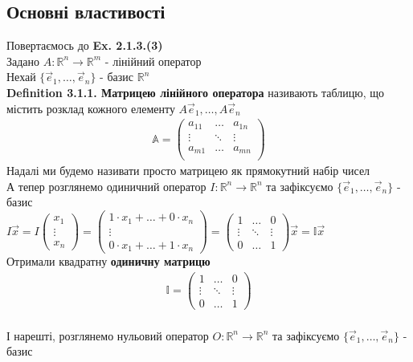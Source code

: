 \documentclass[a4paper, 14pt]{extarticle}
\def\defin#1{\textbf{Definition {#1}}}
\def\bigline{\vspace{5mm}\\}
\begin{document}
	\subsection{Основні властивості}
	Повертаємось до \textbf{Ex. 2.1.3.(3)}\\
	Задано $A: \mathbb{R}^n \to \mathbb{R}^m$ - лінійний оператор\\
	Нехай $\{ \vec{e}_1, \dots, \vec{e}_n \}$ - базис $\mathbb{R}^n$\\
	\defin{3.1.1. Матрицею лінійного оператора} називають таблицю, що містить розклад кожного елементу $A \vec{e}_1, \dots, A \vec{e}_n$
	\begin{align*}
	\mathbb{A} = \begin{pmatrix}
	a_{11} & \dots & a_{1n} \\
	\vdots & \ddots & \vdots \\
	a_{m1} & \dots & a_{mn} \\
	\end{pmatrix}
	\end{align*}
	Надалі ми будемо називати просто матрицею як прямокутний набір чисел
	\bigline
	А тепер розглянемо одиничний оператор $I: \mathbb{R}^n \to \mathbb{R}^n$ та зафіксуємо $\{\vec{e}_1, \dots, \vec{e}_n\}$ - базис\\
	$I \vec{x} = I \begin{pmatrix}
	x_1 \\ \vdots \\ x_n
	\end{pmatrix} = \begin{pmatrix}
	1 \cdot x_1 + \dots + 0 \cdot x_n \\ \vdots \\ 0 \cdot x_1 + \dots + 1 \cdot x_n
	\end{pmatrix} = \begin{pmatrix}
	1 & \dots & 0 \\
	\vdots & \ddots & \vdots \\
	0 & \dots & 1
	\end{pmatrix} \vec{x} = \mathbb{I} \vec{x}$
	\bigline
	Отримали квадратну \textbf{одиничну матрицю}
	\begin{align*}
	\mathbb{I} = \begin{pmatrix}
	1 & \dots & 0 \\
	\vdots & \ddots & \vdots \\
	0 & \dots & 1
	\end{pmatrix}
	\end{align*}
	\bigline
	І нарешті, розглянемо нульовий оператор $O: \mathbb{R}^n \to \mathbb{R}^n$ та зафіксуємо $\{\vec{e}_1, \dots, \vec{e}_n\}$ - базис\\
\end{document}

